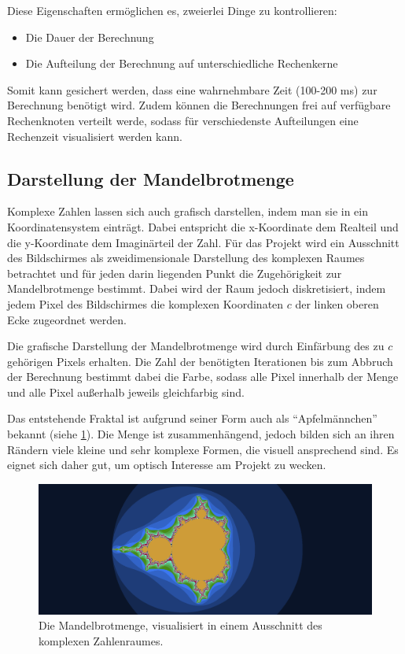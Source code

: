 Diese Eigenschaften ermöglichen es, zweierlei Dinge zu kontrollieren:
\begin{itemize}
    \item Die Dauer der Berechnung
    \item Die Aufteilung der Berechnung auf unterschiedliche Rechenkerne
\end{itemize}

Somit kann gesichert werden, dass eine wahrnehmbare Zeit (100-200 ms) zur Berechnung benötigt wird.
Zudem können die Berechnungen frei auf verfügbare Rechenknoten verteilt werde, sodass
für verschiedenste Aufteilungen eine Rechenzeit visualisiert werden kann.

\subsection{Darstellung der Mandelbrotmenge}

Komplexe Zahlen lassen sich auch grafisch darstellen, indem man sie in ein Koordinatensystem einträgt.
Dabei entspricht die x-Koordinate dem Realteil und die y-Koordinate dem Imaginärteil der Zahl.
Für das Projekt wird ein Ausschnitt des Bildschirmes als zweidimensionale Darstellung des komplexen Raumes
betrachtet und für jeden darin liegenden Punkt die Zugehörigkeit zur Mandelbrotmenge bestimmt.
Dabei wird der Raum jedoch diskretisiert, indem jedem Pixel des Bildschirmes die komplexen Koordinaten $c$
der linken oberen Ecke zugeordnet werden.

Die grafische Darstellung der Mandelbrotmenge wird durch Einfärbung des zu $c$ gehörigen Pixels erhalten.
Die Zahl der benötigten Iterationen bis zum Abbruch der Berechnung bestimmt dabei die Farbe, sodass alle Pixel
innerhalb der Menge und alle Pixel außerhalb jeweils gleichfarbig sind.

Das entstehende Fraktal ist aufgrund seiner Form auch als “Apfelmännchen” bekannt (siehe \ref{mandelbrot_visualisierung_beispiel}).
Die Menge ist zusammenhängend, jedoch bilden sich an ihren Rändern viele kleine und sehr komplexe Formen, die visuell ansprechend sind. Es eignet sich daher gut, um optisch Interesse am Projekt zu wecken.

\begin{figure}
    \label{mandelbrot_visualisierung_beispiel}
    \centering
        \includegraphics[width=0.9\linewidth]{img/Mandelbrot_visualization_example.png}
    \caption{Die Mandelbrotmenge, visualisiert in einem Ausschnitt des komplexen Zahlenraumes.}
\end{figure}

